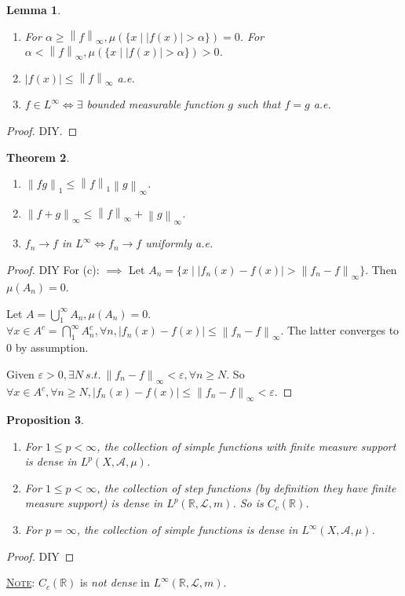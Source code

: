 \documentclass{report}
\newcommand{\R}{\mathbb{R}}
\newcommand{\st}{\ s.t.\ }
\newcommand{\cA}{\mathcal{A}}
\newcommand{\cL}{\mathcal{L}}
\newcommand{\norm}[1]{\left\| #1 \right\|}
\newcommand{\fancyem}[1]{\underline{\textsc{#1}}}
\newtheorem{theorem}{Theorem}[chapter]
\newtheorem{lemma}[theorem]{Lemma}
\newtheorem{proposition}[theorem]{Proposition}
\theoremstyle{definition}
\theoremstyle{remark}
\newcommand{\fnl}{\parbox[t]{0\linewidth}{}}
\begin{document}
\begin{lemma}
	\begin{enumerate}
		\item For $\alpha \geq \norm{f}_\infty, \mu(\{x \mid |f(x)| > \alpha\}) = 0$. For $\alpha < \norm{f}_\infty, \mu(\{x \mid |f(x)| > \alpha\}) > 0$.
		\item $|f(x)| \leq \norm{f}_\infty$ a.e.
		\item $f \in L^\infty \iff \exists$ \emph{bounded} measurable function $g$ such that $f = g$ a.e.
	\end{enumerate}
\end{lemma}
\begin{proof}
	DIY.
\end{proof}

\begin{theorem}\fnl
	\begin{enumerate}
		\item $\norm{fg}_1 \leq \norm{f}_1\norm{g}_\infty$.
		\item $\norm{f + g}_\infty \leq \norm{f}_\infty + \norm{g}_\infty$.
		\item $f_n \to f$ in $L^\infty \iff f_n \to f$ uniformly a.e.
	\end{enumerate}
\end{theorem}
\begin{proof}
	DIY
	For (c): $\implies$ Let $A_n = \{x \mid |f_n(x) - f(x)| > \norm{f_n - f}_\infty\}$. Then $\mu(A_n) = 0$.

	Let $A = \bigcup_1^\infty A_n, \mu(A_n) = 0$. $\forall x \in A^c = \bigcap_1^\infty A_n^c, \forall n, |f_n(x) - f(x)| \leq \norm{f_n - f}_\infty$. The latter converges to $0$ by assumption.

	Given $\varepsilon > 0, \exists N \st \norm{f_n - f}_\infty < \varepsilon, \forall n \geq N$. So $\forall x \in A^c, \forall n \geq N, |f_n(x) - f(x)| \leq \norm{f_n - f}_\infty < \varepsilon$.
\end{proof}

\begin{proposition}\fnl
	\begin{enumerate}
		\item For $1 \leq p < \infty$, the collection of simple functions with finite measure support is dense in $L^p(X, \cA, \mu)$.
		\item For $1 \leq p < \infty$, the collection of step functions (by definition they have finite measure support) is dense in $L^p(\R, \cL, m)$. So is $C_c(\R)$.
		\item For $p = \infty$, the collection of simple functions is dense in $L^\infty(X, \cA, \mu)$.
	\end{enumerate}
\end{proposition}
\begin{proof}
	DIY
\end{proof}
\fancyem{Note}: $C_c(\R)$ is \emph{not dense} in $L^\infty(\R, \cL, m)$.
\end{document}
